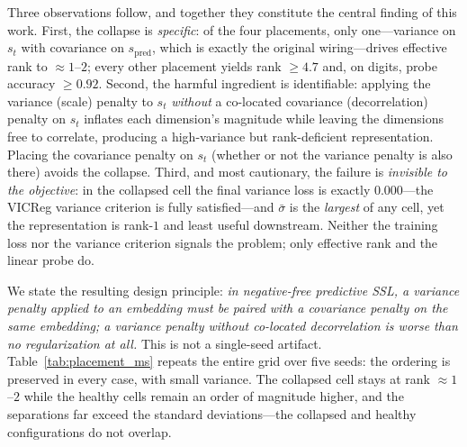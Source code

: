 Three observations follow, and together they constitute the central finding of
this work. First, the collapse is \emph{specific}: of the four placements, only
one---variance on $s_t$ with covariance on $s_{\text{pred}}$, which is exactly
the original wiring---drives effective rank to $\approx 1$--$2$; every other
placement yields rank $\ge 4.7$ and, on digits, probe accuracy $\ge 0.92$.
Second, the harmful ingredient is identifiable: applying the variance
(scale) penalty to $s_t$ \emph{without} a co-located covariance
(decorrelation) penalty on $s_t$ inflates each dimension's magnitude while
leaving the dimensions free to correlate, producing a high-variance but
rank-deficient representation. Placing the covariance penalty on $s_t$
(whether or not the variance penalty is also there) avoids the collapse.
Third, and most cautionary, the failure is \emph{invisible to the objective}:
in the collapsed cell the final variance loss is exactly $0.000$---the VICReg
variance criterion is fully satisfied---and $\bar\sigma$ is the \emph{largest}
of any cell, yet the representation is rank-$1$ and least useful downstream.
Neither the training loss nor the variance criterion signals the problem; only
effective rank and the linear probe do.

We state the resulting design principle: \emph{in negative-free predictive SSL,
a variance penalty applied to an embedding must be paired with a covariance
penalty on the same embedding; a variance penalty without co-located
decorrelation is worse than no regularization at all.} This is not a
single-seed artifact. Table~\ref{tab:placement_ms} repeats the entire grid
over five seeds: the ordering is preserved in every case, with small variance.
The collapsed cell stays at rank $\approx 1$--$2$ while the healthy cells
remain an order of magnitude higher, and the separations far exceed the
standard deviations---the collapsed and healthy configurations do not overlap.

